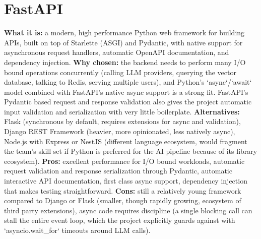 \documentclass[11pt,a4paper]{report}
\begin{document}
\section{FastAPI}
\textbf{What it is:} a modern, high performance Python web framework for building APIs, built on top of Starlette (ASGI) and Pydantic, with native support for asynchronous request handlers, automatic OpenAPI documentation, and dependency injection.
\textbf{Why chosen:} the backend needs to perform many I/O bound operations concurrently (calling LLM providers, querying the vector database, talking to Redis, serving multiple users), and Python's `async`/`await` model combined with FastAPI's native async support is a strong fit. FastAPI's Pydantic based request and response validation also gives the project automatic input validation and serialization with very little boilerplate.
\textbf{Alternatives:} Flask (synchronous by default, requires extensions for async and validation), Django REST Framework (heavier, more opinionated, less natively async), Node.js with Express or NestJS (different language ecosystem, would fragment the team's skill set if Python is preferred for the AI pipeline because of its library ecosystem).
\textbf{Pros:} excellent performance for I/O bound workloads, automatic request validation and response serialization through Pydantic, automatic interactive API documentation, first class async support, dependency injection that makes testing straightforward.
\textbf{Cons:} still a relatively young framework compared to Django or Flask (smaller, though rapidly growing, ecosystem of third party extensions), async code requires discipline (a single blocking call can stall the entire event loop, which the project explicitly guards against with `asyncio.wait_for` timeouts around LLM calls).
\end{document}
